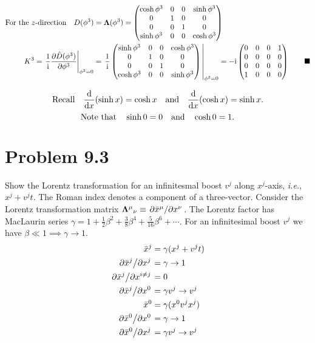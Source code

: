 \documentclass{article}
\begin{document}
\begin{align*}
\qq*{For the $z$-direction}D(\phi^3)&=\vb{\Lambda}(\phi^3)=\begin{pmatrix}
\cosh{\phi^3}&0&0&\sinh{\phi^3}\\
0&1 & 0&0 \\ 
0 & 0&1&0\\
\sinh{\phi^3}&0&0&\cosh{\phi^3}
\end{pmatrix}\\
K^3=\eval{\frac{1}{\text{i}}\pdv{\hat{D}(\phi^3)}{\phi^3}}_{\phi^3=0}&=\eval{\frac{1}{\text{i}}\begin{pmatrix}
		\sinh{\phi^3}&0&0&\cosh{\phi^3}\\
0&1 & 0&0 \\ 
0 & 0&1&0\\
\cosh{\phi^3}&0&0&\sinh{\phi^3}
		\end{pmatrix}}_{\phi^3=0}=-\text{i}\begin{pmatrix}
		0&0&0&1\\
		0 & 0&0&0\\
		0&0&0&0 \\
		1&0 & 0&0 
		\end{pmatrix}\qquad\blacksquare
\end{align*}

\[\qq*{Recall}\dv{x}(\sinh x)=\cosh x\qand\dv{x}(\cosh x)=\sinh x.\]
\[\qq*{Note that}\sinh 0=0\qand\cosh 0=1.\]



\section*{Problem 9.3}

Show the Lorentz transformation for an infinitesmal boost $v^j$ along $x^j$-axis, \emph{i.e.}, $x^j+v^j t$. The Roman index denotes a component of a three-vector. Consider the Lorentz transformation matrix ${\vb{\Lambda}^\mu}_\nu\equiv\pdv*{\bar{x}^\mu}{x^\nu}$. The Lorentz factor has MacLaurin series $\gamma=1+\frac{1}{2}\beta^2+\frac{3}{8}\beta^4+\frac{5}{16}\beta^6+\cdots$. For an infinitesimal boost $v^j $ we have $\beta\ll 1 \implies\gamma\to 1$. 
\begin{align*}
	\bar{x}^j&=\gamma(x^j+v^j t)\\
	\pdv*{\bar{x}^j}{x^j}&=\gamma\to 1\\
	\pdv*{\bar{x}^j}{x^{i\neq j}}&=0\\
	\pdv*{\bar{x}^j}{x^0}&=	\gamma v^j\to v^j\\
	\bar{x}^0&=\gamma(x^0v^j x^j)\\
	\pdv*{\bar{x}^0}{x^0}&=\gamma\to 1\\
	\pdv*{\bar{x}^0}{x^j}&=\gamma v^j\to v^j\\
\end{align*}
\end{document}
